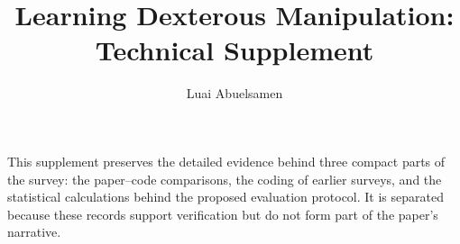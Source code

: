 \documentclass[journal]{IEEEtran}
\begin{document}
\title{Learning Dexterous Manipulation:\\Technical Supplement}
\author{Luai Abuelsamen}
\maketitle

This supplement preserves the detailed evidence behind three compact parts of the survey: the
paper--code comparisons, the coding of earlier surveys, and the statistical calculations behind
the proposed evaluation protocol. It is separated because these records support verification but
do not form part of the paper's narrative.

\appendices






\end{document}
